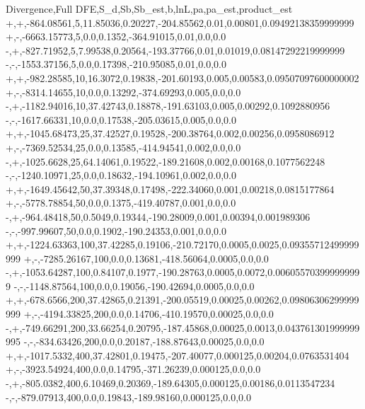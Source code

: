 Divergence,Full DFE,S_d,Sb,Sb_est,b,lnL,pa,pa_est,product_est
+,+,-864.08561,5,11.85036,0.20227,-204.85562,0.01,0.00801,0.09492138359999999
+,-,-6663.15773,5,0.0,0.1352,-364.91015,0.01,0.0,0.0
-,+,-827.71952,5,7.99538,0.20564,-193.37766,0.01,0.01019,0.08147292219999999
-,-,-1553.37156,5,0.0,0.17398,-210.95085,0.01,0.0,0.0
+,+,-982.28585,10,16.3072,0.19838,-201.60193,0.005,0.00583,0.09507097600000002
+,-,-8314.14655,10,0.0,0.13292,-374.69293,0.005,0.0,0.0
-,+,-1182.94016,10,37.42743,0.18878,-191.63103,0.005,0.00292,0.1092880956
-,-,-1617.66331,10,0.0,0.17538,-205.03615,0.005,0.0,0.0
+,+,-1045.68473,25,37.42527,0.19528,-200.38764,0.002,0.00256,0.0958086912
+,-,-7369.52534,25,0.0,0.13585,-414.94541,0.002,0.0,0.0
-,+,-1025.6628,25,64.14061,0.19522,-189.21608,0.002,0.00168,0.1077562248
-,-,-1240.10971,25,0.0,0.18632,-194.10961,0.002,0.0,0.0
+,+,-1649.45642,50,37.39348,0.17498,-222.34060,0.001,0.00218,0.0815177864
+,-,-5778.78854,50,0.0,0.1375,-419.40787,0.001,0.0,0.0
-,+,-964.48418,50,0.5049,0.19344,-190.28009,0.001,0.00394,0.001989306
-,-,-997.99607,50,0.0,0.1902,-190.24353,0.001,0.0,0.0
+,+,-1224.63363,100,37.42285,0.19106,-210.72170,0.0005,0.0025,0.09355712499999999
+,-,-7285.26167,100,0.0,0.13681,-418.56064,0.0005,0.0,0.0
-,+,-1053.64287,100,0.84107,0.1977,-190.28763,0.0005,0.0072,0.006055703999999999
-,-,-1148.87564,100,0.0,0.19056,-190.42694,0.0005,0.0,0.0
+,+,-678.6566,200,37.42865,0.21391,-200.05519,0.00025,0.00262,0.09806306299999999
+,-,-4194.33825,200,0.0,0.14706,-410.19570,0.00025,0.0,0.0
-,+,-749.66291,200,33.66254,0.20795,-187.45868,0.00025,0.0013,0.043761301999999995
-,-,-834.63426,200,0.0,0.20187,-188.87643,0.00025,0.0,0.0
+,+,-1017.5332,400,37.42801,0.19475,-207.40077,0.000125,0.00204,0.0763531404
+,-,-3923.54924,400,0.0,0.14795,-371.26239,0.000125,0.0,0.0
-,+,-805.0382,400,6.10469,0.20369,-189.64305,0.000125,0.00186,0.0113547234
-,-,-879.07913,400,0.0,0.19843,-189.98160,0.000125,0.0,0.0

